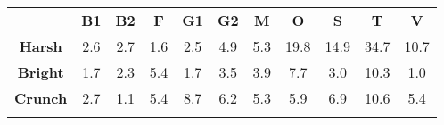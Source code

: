 \begin{tabular}{|c||c|c|c|c|c|c|c|c|c|c|}
	\cline{2-11}
	\multicolumn{1}{c|}{} & \bf{B1} & \bf{B2} & \bf{F} & \bf{G1} & \bf{G2} & \bf{M} & \bf{O} & \bf{S} & \bf{T} & \bf{V} \tabularnewline
	\hhline{~|-|-|-|-|-|-|-|-|-|-|}
	\noalign{\vspace{\doublerulesep}}
	\hhline{-||-|-|-|-|-|-|-|-|-|-|}
	\bf{Harsh} &  2.6 &  2.7 &  1.6 &  2.5 &  4.9 &  5.3 & 19.8 & 14.9 & 34.7 & 10.7 \tabularnewline
	\hhline{-||-|-|-|-|-|-|-|-|-|-|}
	\bf{Bright} &  1.7 &  2.3 &  5.4 &  1.7 &  3.5 &  3.9 &  7.7 &  3.0 & 10.3 &  1.0 \tabularnewline
	\hhline{-||-|-|-|-|-|-|-|-|-|-|}
	\bf{Crunch} &  2.7 &  1.1 &  5.4 &  8.7 &  6.2 &  5.3 &  5.9 &  6.9 & 10.6 &  5.4 \tabularnewline
	\hhline{-||-|-|-|-|-|-|-|-|-|-|}
\end{tabular}
